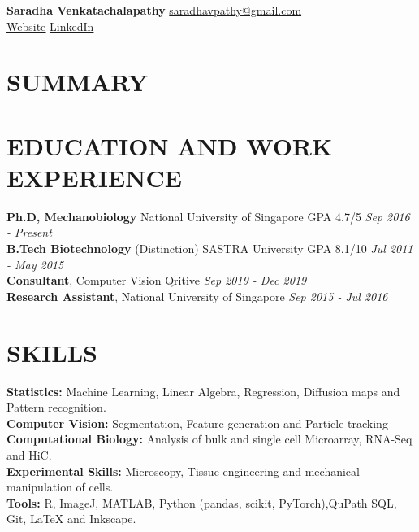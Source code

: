 \documentclass[letterpaper,11pt]{article}
\begin{document}
\begin{flushleft}
{\LARGE {\bf Saradha Venkatachalapathy}} \hfill  {\href{mailto:saradhavpathy@gmail.com}{saradhavpathy@gmail.com}}\\
{ }\hfill {\href{https://saradhavenkatachalapathy.github.io/}{\underline {Website}}}{ }
  {\textbar}{ }{\href{https://www.linkedin.com/in/saradhav/}{\underline {LinkedIn}}} \\
 \end{flushleft}
\section{\bf SUMMARY}


\vspace{0.8mm}
\section{\bf EDUCATION AND WORK EXPERIENCE}
{\bf Ph.D, Mechanobiology }{\textbar}{ National University of Singapore }{\textbar}{ GPA 4.7/5} \hfill {\em Sep 2016 - Present} 
\\
{\bf B.Tech Biotechnology }{(Distinction) }{\textbar}{ SASTRA University }{\textbar}{ GPA 8.1/10} \hfill {\em Jul 2011 - May 2015} 
\\
{\bf Consultant}{, Computer Vision }{\textbar}{ }\href{https://www.qritive.com/}{\underline {Qritive}} \hfill {\em Sep 2019 - Dec 2019} 
\\
{\bf Research Assistant}{, National University of Singapore }
\hfill {\em Sep 2015 - Jul 2016} 

\vspace{0.8mm}
\section{\bf SKILLS}
{\bf Statistics: }{Machine Learning, Linear Algebra, Regression, Diffusion maps and Pattern recognition.}
\\
{\bf Computer Vision: }{Segmentation, Feature generation and Particle tracking}
\\
{\bf Computational Biology: }{Analysis of bulk and single cell Microarray, RNA-Seq and HiC.}
\\
{\bf Experimental Skills: }{Microscopy, Tissue engineering and mechanical manipulation of cells.}
\\
{\bf Tools: }{R, ImageJ, MATLAB, Python (pandas, scikit, PyTorch),QuPath SQL, Git, LaTeX and Inkscape.}
\vspace{0.8mm}
\end{document}

